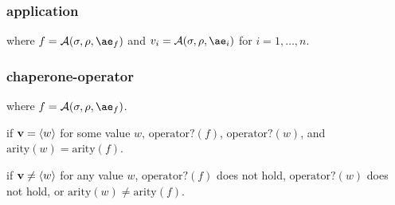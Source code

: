 \documentclass{sigplanconf}
\begin{document}
\subsubsection{application}

\noindent
{}

\noindent
where $f=\A{\sigma}{\rho}{\ae_f}$ and $v_i=\A{\sigma}{\rho}{\ae_i}$ for $i=1,\dots,n$.

\subsubsection{chaperone-operator}

\noindent
{}

\noindent
where $f=\A{\sigma}{\rho}{\ae_f}$.

\noindent
{}

\noindent
if $\mathbf{v}=\langle w\rangle$ for some value $w$, $\mathrm{operator?}(f)$, $\mathrm{operator?}(w)$, and $\mathrm{arity}(w)=\mathrm{arity}(f)$.

\noindent
{}

\noindent
if $\mathbf{v}\ne\langle w\rangle$ for any value $w$, $\mathrm{operator?}(f)$ does not hold, $\mathrm{operator?}(w)$ does not hold, or $\mathrm{arity}(w)\ne\mathrm{arity}(f)$.




\end{document}
